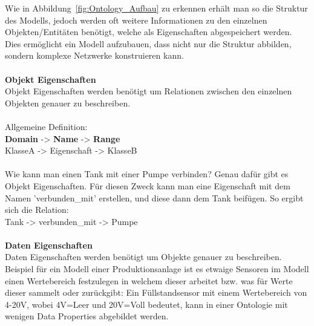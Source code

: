 \begin{displayquote}
Wie in Abbildung~\ref{fig:Ontology_Aufbau} zu erkennen erhält man so die Struktur des Modells, jedoch werden oft weitere Informationen zu den einzelnen Objekten/Entitäten benötigt, welche als Eigenschaften abgespeichert werden.\\
Dies ermöglicht ein Modell aufzubauen, dass nicht nur die Struktur abbilden, sondern komplexe Netzwerke konstruieren kann.\\
\\
\noindent \textbf{Objekt Eigenschaften}\\
Objekt Eigenschaften werden benötigt um Relationen zwischen den einzelnen Objekten genauer zu beschreiben.\\
\\
Allgemeine Definition:\\
\textbf{Domain} -> \textbf{Name} -> \textbf{Range}\\
KlasseA -> Eigenschaft -> KlasseB\\
\\
Wie kann man einen Tank mit einer Pumpe verbinden?  Genau dafür gibt es Objekt Eigenschaften. Für diesen Zweck kann man eine Eigenschaft mit dem Namen 'verbunden\_mit' erstellen, und diese dann dem Tank beifügen. So ergibt sich die Relation:\\
Tank -> verbunden\_mit -> Pumpe\\
\\
\textbf{Daten Eigenschaften}\\
Daten Eigenschaften werden benötigt um Objekte genauer zu beschreiben. 
\\
Beispiel für ein Modell einer Produktionsanlage ist es etwaige Sensoren im Modell einen Wertebereich festzulegen in welchem dieser arbeitet bzw. was für Werte dieser sammelt oder zurückgibt: Ein Füllstandsensor mit einem Wertebereich von 4-20V, wobei 4V=Leer und 20V=Voll bedeutet, kann in einer Ontologie mit wenigen Data Properties abgebildet werden.


\end{displayquote}
